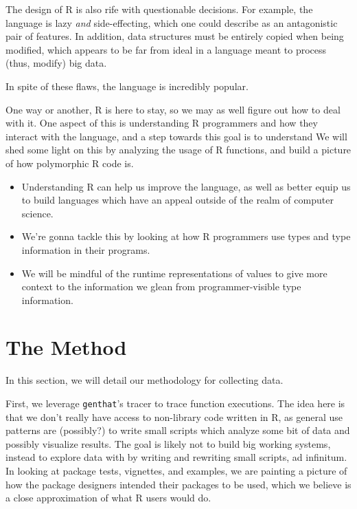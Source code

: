 \documentclass[acmsmall,10pt,review,anonymous]{acmart}\settopmatter{printfolios=true,printccs=false,printacmref=false}
\begin{document}
The design of R is also rife with questionable decisions.  For example, the
language is lazy \textit{and} side-effecting, which one could describe as an
antagonistic pair of features.  In addition, data structures must be
entirely copied when being modified, which appears to be far from ideal in a
language meant to process (thus, modify) big data.

In spite of these flaws, the language is incredibly popular.

One way or another, R is here to stay, so we may as well figure out how to
deal with it.  One aspect of this is understanding R programmers and how
they interact with the language, and a step towards this goal is to
understand   We will shed some light on
this by analyzing the usage of R functions, and build a picture of how
polymorphic R code is.

\begin{itemize}
    \item Understanding R can help us improve the language, as well as
      better equip us to build languages which have an appeal outside of the
      realm of computer science.
    \item We're gonna tackle this by looking at how R programmers use types
      and type information in their programs.
    \item We will be mindful of the runtime representations of values to
      give more context to the information we glean from programmer-visible
      type information.
\end{itemize}

%
%
%
%
%
%
\section{The Method}

In this section, we will detail our methodology for collecting data.

First, we leverage {\tt genthat}'s tracer to trace function executions.  The
idea here is that we don't really have access to non-library code written in
R, as general use patterns are (possibly?) to write small scripts which
analyze some bit of data and possibly visualize results.  The goal is likely
not to build big working systems, instead to explore data with by writing
and rewriting small scripts, ad infinitum.  In looking at package tests,
vignettes, and examples, we are painting a picture of how the package
designers intended their packages to be used, which we believe is a close
approximation of what R users would do.
\end{document}

